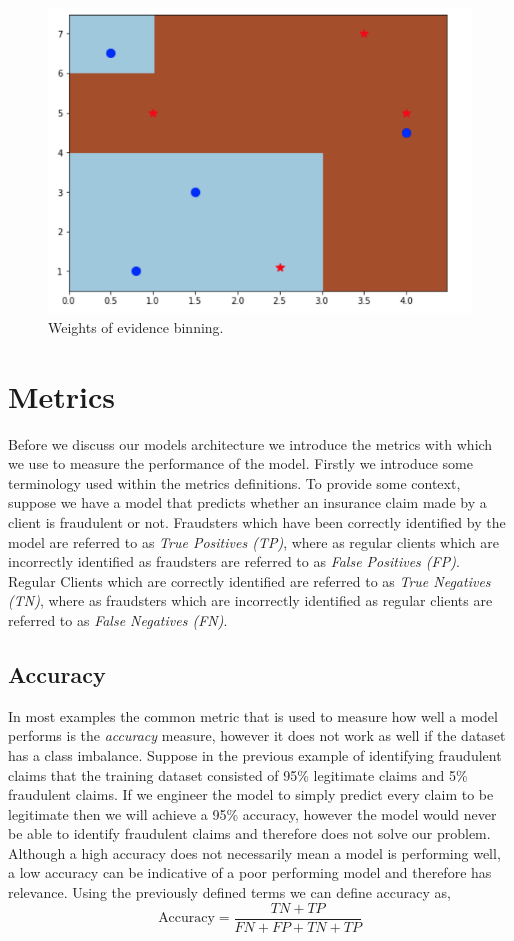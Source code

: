 \begin  {figure}[!htpb]
\centering
  \includegraphics[width=\linewidth]{Credit_Images/WOE_EXPLANATION.png}
   \caption{Weights of evidence binning.}
    \label{fig-woe-binning}
\end{figure}

 



\section{Metrics}
Before we discuss our models architecture we introduce the metrics with which we use to measure the performance of the model. Firstly we introduce some terminology used within the metrics definitions. To provide some context, suppose we have a model that predicts whether an insurance claim made by a client is fraudulent or not. Fraudsters which have been correctly identified by the model are referred to as \emph{True Positives (TP)}, where as regular clients which are incorrectly identified as fraudsters are referred to as \emph{False Positives (FP)}. Regular Clients which are correctly identified are referred to as \emph{True Negatives (TN)}, where as fraudsters which are incorrectly identified as regular clients are referred to as \emph{False Negatives (FN)}.
\subsection{Accuracy}
 In most examples the common metric that is used to measure how well a model performs is the \emph{accuracy} measure, however it does not work as well if the dataset has a class imbalance. Suppose in the previous example of identifying fraudulent claims that the training dataset consisted of 95\% legitimate claims and 5\% fraudulent claims. If we engineer the model to simply predict every claim to be legitimate then we will achieve a 95\% accuracy, however the model would never be able to identify fraudulent claims and therefore does not solve our problem. Although a high accuracy does not necessarily mean a model is performing well, a low accuracy can be indicative of a poor performing model and therefore has relevance. Using the previously defined terms we can define accuracy as,
\begin{equation}
    \mbox{Accuracy} = \frac{TN + TP}{FN + FP + TN + TP}
\end{equation}
